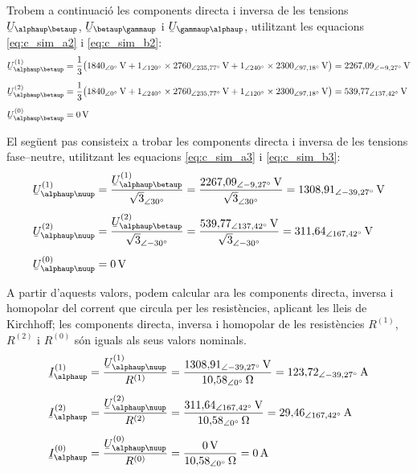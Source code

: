 \begin{exemple}
Trobem a continuaci\'{o} les components directa i inversa de les
tensions $\cmplx{U}_{\alphaup\betaup}$, $\cmplx{U}_{\betaup\gammaup}$ i
$\cmplx{U}_{\gammaup\alphaup}$, utilitzant les equacions
\eqref{eq:c_sim_a2} i \eqref{eq:c_sim_b2}:
\begin{align*}
\cmplx{U}_{\alphaup\betaup}\ap{(1)} &= \frac{1}{3} \big(
1840_{\angle 0\degree}\unit{V} + 1_{\angle
120\degree} \times 2760_{\angle 235{,}77\degree}\unit{V} +
1_{\angle 240\degree} \times 2300_{\angle
97{,}18\degree}\unit{V} \big) = 2267{,}09_{\angle -9{,}27\degree}\unit{V} \\[1ex]
\cmplx{U}_{\alphaup\betaup}\ap{(2)} &= \frac{1}{3} \big(
1840_{\angle 0\degree}\unit{V} + 1_{\angle
240\degree} \times 2760_{\angle 235{,}77\degree}\unit{V} +
1_{\angle 120\degree} \times 2300_{\angle
97{,}18\degree}\unit{V} \big) = 539{,}77_{\angle
137{,}42\degree}\unit{V} \\[1ex]
\cmplx{U}_{\alphaup\betaup}\ap{(0)} &= 0\unit{V}
\end{align*}

El seg\"{u}ent pas consisteix a trobar les components directa i inversa
de les tensions fase--neutre, utilitzant les equacions
\eqref{eq:c_sim_a3} i \eqref{eq:c_sim_b3}:
\begin{align*}
\cmplx{U}_{\alphaup\nuup}\ap{(1)} &=
\frac{\cmplx{U}_{\alphaup\betaup}\ap{(1)}}{\sqrt{3}_{\angle
30\degree}} = \frac{2267{,}09_{\angle
-9{,}27\degree}\unit{V}}{\sqrt{3}_{\angle
30\degree}} = 1308{,}91_{\angle -39{,}27\degree}\unit{V} \\[1ex]
\cmplx{U}_{\alphaup\nuup}\ap{(2)} &=
\frac{\cmplx{U}_{\alphaup\betaup}\ap{(2)}}{\sqrt{3}_{\angle
-30\degree}} = \frac{539{,}77_{\angle
137{,}42\degree}\unit{V}}{\sqrt{3}_{\angle -30\degree}} =
311{,}64_{\angle 167{,}42\degree}\unit{V} \\[1ex]
\cmplx{U}_{\alphaup\nuup}\ap{(0)} &= 0\unit{V}
\end{align*}

A partir d'aquests valors, podem calcular ara les components
directa, inversa i homopolar del corrent que circula per les
resist\`{e}ncies, aplicant les lleis de Kirchhoff; les components
directa, inversa i homopolar de les resist\`{e}ncies $R^{(1)}$,
$R^{(2)}$ i $R^{(0)}$ s\'{o}n iguals als seus valors nominals.
\begin{align*}
\cmplx{I}_\alphaup\ap{(1)} &=
\frac{\cmplx{U}_{\alphaup\nuup}\ap{(1)}}{R^{(1)}} =
\frac{1308{,}91_{\angle
-39{,}27\degree}\unit{V}}{10{,}58_{\angle 0 \degree}
\unit{\ohm}} =
123{,}72_{\angle -39{,}27\degree}\unit{A} \\[1ex]
\cmplx{I}_\alphaup\ap{(2)} &=
\frac{\cmplx{U}_{\alphaup\nuup}\ap{(2)}}{R^{(2)}} =
\frac{311{,}64_{\angle
167{,}42\degree}\unit{V}}{10{,}58_{\angle 0 \degree}
\unit{\ohm}} = 29{,}46_{\angle 167{,}42\degree}\unit{A} \\[1ex]
\cmplx{I}_\alphaup\ap{(0)} &=
\frac{\cmplx{U}_{\alphaup\nuup}\ap{(0)}}{R^{(0)}} =
\frac{0\unit{V}}{10{,}58_{\angle 0 \degree}\unit{\ohm}} =
0\unit{A}
\end{align*}


\end{exemple}
